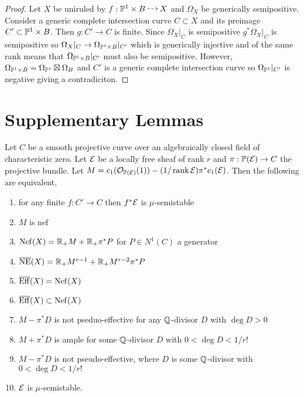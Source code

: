 \documentclass[12pt]{article}
\begin{document}
\begin{proof}
Let $X$ be uniruled by $f : \P^1 \times B \rat X$ and $\Omega_X$ be generically semipositive. Consider a generic complete intersection curve $C \subset X$ and its preimage $C' \subset \P^1 \times B$. Then $g : C' \to C$ is finite. Since $\Omega_X |_C$ is semipositive $g^* \Omega_X|_C$ is semipositive so $\Omega_X|_C \to \Omega_{\P^1 \times B}|_{C'}$ which is generically injective and of the same rank means that $\Omega_{\P^1 \times B}|_{C'}$ must also be semipositive. However, $\Omega_{\P^1 \times B} = \Omega_{\P^1} \boxtimes \Omega_{B}$ and $C'$ is a generic complete intersection curve so $\Omega_{\P^1}|_{C'}$ is negative giving a contradiciton.
\end{proof}

\section{Supplementary Lemmas}

\newcommand{\Nef}{\mathrm{Nef}}
\newcommand{\Eff}{\mathrm{Eff}}
\newcommand{\NE}{\mathrm{NE}}

\begin{prop}
Let $C$ be a smooth projective curve over an algebraically closed field of characteristic zero. Let $\E$ be a locally free sheaf of rank $r$ and $\pi : \P(\E) \to C$ the projective bundle. Let $M = c_1(\struct{\P(\E)}(1)) - (1/\rank{\E}) \pi^* c_1(\E)$. Then the following are equivalent,
\begin{enumerate}
\item for any finite $f : C' \to C$ then $f^* \E$ is $\mu$-semistable
\item $M$ is nef
\item $\Nef(X) = \RR_{+} M + \RR_{+} \pi^* P$  for $P \in N^1(C)$ a generator
\item $\ol{\NE}(X) = \RR_{+} M^{r-1} + \RR_{+} M^{r-2} \pi^* P$
\item $\ol{\Eff}(X) = \Nef(X)$
\item $\ol{\Eff}(X) \subset \Nef(X)$
\item $M - \pi^* D$ is not pseduo-effective for any $\Q$-divisor $D$ with $\deg{D} > 0$
\item $M + \pi^* D$ is ample for some $\Q$-divisor $D$ with $0 < \deg{D} < 1/r!$
\item $M - \pi^* D$ is not pseudo-effective, where $D$ is some $\Q$-divisor with $0 < \deg{D} < 1/r!$
\item $\E$ is $\mu$-semistable.
\end{enumerate}
\end{prop}
\end{document}
